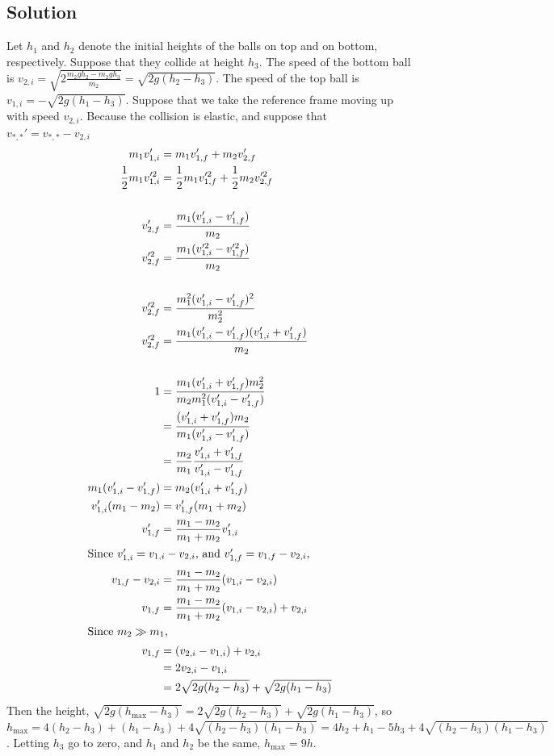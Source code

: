 \documentclass[solutions]{esg8012pset}
\begin{document}
\subsection*{Solution}
  Let $h_1$ and $h_2$ denote the initial heights of the balls on top and on bottom, respectively.  Suppose that they collide at height $h_3$.  The speed of the bottom ball is $v_{2, i} = \sqrt{2\frac{m_2gh_2 - m_2 g h_3}{m_2}} = \sqrt{2g(h_2 - h_3)}$.  The speed of the top ball is $v_{1, i} = -\sqrt{2g(h_1-h_3)}$.  Suppose that we take the reference frame moving up with speed $v_{2, i}$.  Because the collision is elastic, and suppose that $v_{*, *}' = v_{*, *} - v_{2, i}$ \begin{align*}
    m_1 v_{1,i}' & = m_1 v_{1,f}' + m_2 v_{2,f}' \\
    \frac{1}{2}m_1 v_{1,i}'^2 & = \frac{1}{2}m_1 v_{1,f}'^2 + \frac{1}{2}m_2 v_{2,f}'^2 \\
    \\
    v_{2,f}' & =  \frac{m_1(v_{1,i}' - v_{1,f}')}{m_2} \\
    v_{2,f}'^2 & = \frac{m_1(v_{1,i}'^2 - v_{1,f}'^2)}{m_2} \\
    \\
    v_{2,f}'^2 & = \frac{m_1^2(v_{1,i}' - v_{1,f}')^2}{m_2^2} \\
    v_{2,f}'^2 & = \frac{m_1(v_{1,i}' - v_{1,f}')(v_{1,i}' + v_{1,f}')}{m_2} \\
    \\
    1 & = \frac{m_1(v_{1,i}' + v_{1,f}') m_2^2}{m_2 m_1^2 (v_{1,i}' - v_{1,f}')} \\
      & = \frac{(v_{1,i}' + v_{1,f}') m_2}{m_1 (v_{1,i}' - v_{1,f}')} \\
      & = \frac{m_2}{m_1}\frac{v_{1,i}' + v_{1,f}'}{v_{1,i}' - v_{1,f}'} \\
    m_1(v_{1,i}' - v_{1,f}') & = m_2(v_{1,i}' + v_{1,f}') \\
    v_{1,i}'(m_1 - m_2) & =  v_{1,f}'(m_1 + m_2) \\
    v_{1, f}' & = \frac{m_1 - m_2}{m_1 + m_2}v_{1,i}' \\
    \intertext{Since $v_{1, i}' = v_{1, i} - v_{2, i}$, and $v_{1, f}' = v_{1, f} - v_{2, i}$,}
    v_{1, f} - v_{2, i} & = \frac{m_1 - m_2}{m_1 + m_2}(v_{1, i} - v_{2, i}) \\
    v_{1, f} & = \frac{m_1 - m_2}{m_1 + m_2}(v_{1, i} - v_{2, i}) + v_{2, i} \\
    \intertext{Since $m_2\gg m_1$,}
    v_{1, f} & = (v_{2, i} - v_{1, i}) + v_{2, i} \\
    & = 2v_{2, i} - v_{1, i} \\
    & = 2\sqrt{2g(h_2 - h_3)} + \sqrt{2g(h_1-h_3)}
    \end{align*}
    Then the height, $\sqrt{2g(h_{\text{max}} - h_3)} = 2\sqrt{2g(h_2 - h_3)} + \sqrt{2g(h_1-h_3)}$, so $h_{\text{max}} = 4(h_2 - h_3) + (h_1 - h_3) + 4\sqrt{(h_2 - h_3)(h_1 - h_3)} = 4h_2 + h_1 - 5h_3 + 4\sqrt{(h_2 - h_3)(h_1 - h_3)}$.  Letting $h_3$ go to zero, and $h_1$ and $h_2$ be the same, $h_{\text{max}} = 9h$.
\end{document}
